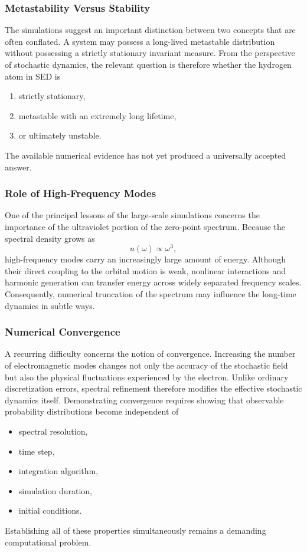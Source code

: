 \subsubsection{Metastability Versus Stability}
The simulations suggest an important distinction between two concepts
that are often conflated.
A system may possess a long-lived metastable distribution without
possessing a strictly stationary invariant measure.
From the perspective of stochastic dynamics, the relevant question is
therefore whether the hydrogen atom in SED is
\begin{enumerate}
\item
strictly stationary,
\item
metastable with an extremely long lifetime,
\item
or ultimately unstable.
\end{enumerate}
The available numerical evidence has not yet produced a universally
accepted answer.
\subsubsection{Role of High-Frequency Modes}
One of the principal lessons of the large-scale simulations concerns the
importance of the ultraviolet portion of the zero-point spectrum.
Because the spectral density grows as
\[u(\omega)\propto\omega^3,\]
high-frequency modes carry an increasingly large amount of energy.
Although their direct coupling to the orbital motion is weak, nonlinear
interactions and harmonic generation can transfer energy across widely
separated frequency scales.
Consequently, numerical truncation of the spectrum may influence the
long-time dynamics in subtle ways.
\subsubsection{Numerical Convergence}
A recurring difficulty concerns the notion of convergence.
Increasing the number of electromagnetic modes changes not only the
accuracy of the stochastic field but also the physical fluctuations
experienced by the electron.
Unlike ordinary discretization errors, spectral refinement therefore
modifies the effective stochastic dynamics itself.
Demonstrating convergence requires showing that observable probability
distributions become independent of
\begin{itemize}
\item
spectral resolution,
\item
time step,
\item
integration algorithm,
\item
simulation duration,
\item
initial conditions.
\end{itemize}
Establishing all of these properties simultaneously remains a demanding
computational problem.
